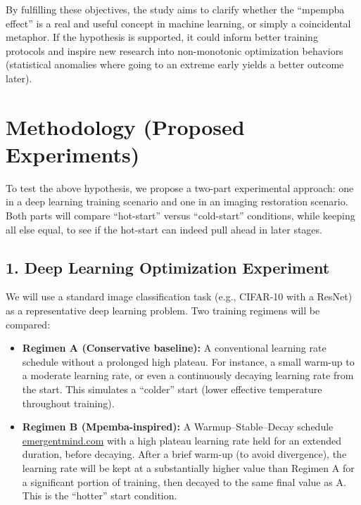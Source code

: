 \documentclass[11pt]{article}
\begin{document}
By fulfilling these objectives, the study aims to clarify whether the ``mpempba effect'' is a real and useful concept in machine learning, or simply a coincidental metaphor. If the hypothesis is supported, it could inform better training protocols and inspire new research into non-monotonic optimization behaviors (statistical anomalies where going to an extreme early yields a better outcome later).

\section{Methodology (Proposed Experiments)}

To test the above hypothesis, we propose a two-part experimental approach: one in a deep learning training scenario and one in an imaging restoration scenario. Both parts will compare ``hot-start'' versus ``cold-start'' conditions, while keeping all else equal, to see if the hot-start can indeed pull ahead in later stages.

\subsection*{1. Deep Learning Optimization Experiment}
We will use a standard image classification task (e.g., CIFAR-10 with a ResNet) as a representative deep learning problem. Two training regimens will be compared:

\begin{itemize}
  \item \textbf{Regimen A (Conservative baseline):} A conventional learning rate schedule without a prolonged high plateau. For instance, a small warm-up to a moderate learning rate, or even a continuously decaying learning rate from the start. This simulates a ``colder'' start (lower effective temperature throughout training).
  \item \textbf{Regimen B (Mpemba-inspired):} A Warmup--Stable--Decay schedule\,\href{https://www.emergentmind.com/topics/warmup-stable-decay-wsd-schedules#:~:text=The combination of these three,several empirical and theoretical insights}{emergentmind.com} with a high plateau learning rate held for an extended duration, before decaying. After a brief warm-up (to avoid divergence), the learning rate will be kept at a substantially higher value than Regimen A for a significant portion of training, then decayed to the same final value as A. This is the ``hotter'' start condition.
\end{itemize}
\end{document}

